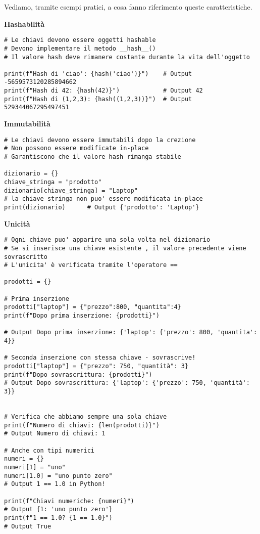 Vediamo, tramite esempi pratici, a cosa fanno riferimento queste caratteristiche.
\vspace{0.5cm}

\textbf{Hashabilità}
\begin{lstlisting}
# Le chiavi devono essere oggetti hashable
# Devono implementare il metodo __hash__()
# Il valore hash deve rimanere costante durante la vita dell'oggetto

print(f"Hash di 'ciao': {hash('ciao')}")    # Output -5659573120285894662
print(f"Hash di 42: {hash(42)}")            # Output 42
print(f"Hash di (1,2,3): {hash((1,2,3))}")  # Output 529344067295497451
\end{lstlisting}

\vspace{0.5cm}
\textbf{Immutabilità}
\begin{lstlisting}
# Le chiavi devono essere immutabili dopo la crezione
# Non possono essere modificate in-place
# Garantiscono che il valore hash rimanga stabile

dizionario = {}
chiave_stringa = "prodotto"
dizionario[chiave_stringa] = "Laptop"
# la chiave stringa non puo' essere modificata in-place
print(dizionario)      # Output {'prodotto': 'Laptop'}
\end{lstlisting}

\vspace{0.5cm}
\textbf{Unicità}
\begin{lstlisting}
# Ogni chiave puo' apparire una sola volta nel dizionario
# Se si inserisce una chiave esistente , il valore precedente viene sovrascritto
# L'unicita' è verificata tramite l'operatore ==

prodotti = {}

# Prima inserzione
prodotti["laptop"] = {"prezzo":800, "quantita":4}
print(f"Dopo prima inserzione: {prodotti}")

# Output Dopo prima inserzione: {'laptop': {'prezzo': 800, 'quantita': 4}}

# Seconda inserzione con stessa chiave - sovrascrive!
prodotti["laptop"] = {"prezzo": 750, "quantità": 3}
print(f"Dopo sovrascrittura: {prodotti}")
# Output Dopo sovrascrittura: {'laptop': {'prezzo': 750, 'quantità': 3}}


# Verifica che abbiamo sempre una sola chiave
print(f"Numero di chiavi: {len(prodotti)}")  
# Output Numero di chiavi: 1

# Anche con tipi numerici
numeri = {}
numeri[1] = "uno"
numeri[1.0] = "uno punto zero"  
# Output 1 == 1.0 in Python!

print(f"Chiavi numeriche: {numeri}")  
# Output {1: 'uno punto zero'}
print(f"1 == 1.0? {1 == 1.0}")  
# Output True
\end{lstlisting}


